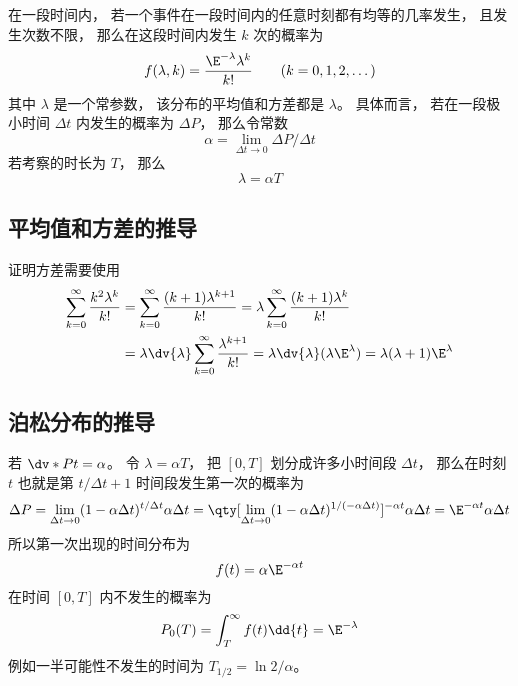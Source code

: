 

在一段时间内， 若一个事件在一段时间内的任意时刻都有均等的几率发生， 且发生次数不限， 那么在这段时间内发生 $k$ 次的概率为
\begin{equation}
f(\lambda, k) = \frac{\E^{-\lambda}\lambda^k}{k!} \qquad (k = 0,1,2,\dots)
\end{equation}
其中 $\lambda$ 是一个常参数， 该分布的平均值和方差都是 $\lambda$。 具体而言， 若在一段极小时间 $\Delta t$ 内发生的概率为 $\Delta P$， 那么令常数
\begin{equation}
\alpha = \lim_{\Delta t\to 0}\Delta P/\Delta t
\end{equation}
若考察的时长为 $T$， 那么
\begin{equation}
\lambda = \alpha T
\end{equation}

\subsection{平均值和方差的推导}
证明方差需要使用
\begin{equation}
\begin{aligned}
\sum_{k=0}^\infty \frac{k^2\lambda^{k}}{k!}
&= \sum_{k=0}^\infty \frac{(k+1)\lambda^{k+1}}{k!}
= \lambda \sum_{k=0}^\infty \frac{(k+1)\lambda^k}{k!}\\
&= \lambda\dv{\lambda} \sum_{k=0}^\infty \frac{\lambda^{k+1}}{k!}
= \lambda \dv{\lambda} (\lambda \E^{\lambda})
= \lambda(\lambda+1)\E^{\lambda}
\end{aligned}
\end{equation}

\subsection{泊松分布的推导}
若 $\dv*{P}{t} = \alpha$。 令 $\lambda = \alpha T$， 把 $[0,T]$ 划分成许多小时间段 $\Delta t$， 那么在时刻 $t$ 也就是第 $t/\Delta t+1$ 时间段发生第一次的概率为
\begin{equation}
\Delta P = \lim_{\Delta t\to 0}(1 - \alpha\Delta t)^{t/\Delta t} \alpha\Delta t
= \qty[\lim_{\Delta t\to 0}(1 - \alpha\Delta t)^{1/(-\alpha\Delta t)}]^{-\alpha t} \alpha\Delta t
= \E^{-\alpha t} \alpha \Delta t
\end{equation}
所以第一次出现的时间分布为
\begin{equation}
f(t) = \alpha\E^{-\alpha t}
\end{equation}
在时间 $[0,T]$ 内不发生的概率为
\begin{equation}
P_0(T) = \int_{T}^\infty f(t) \dd{t} = \E^{-\lambda}
\end{equation}
例如一半可能性不发生的时间为 $T_{1/2} = \ln 2/\alpha$。

